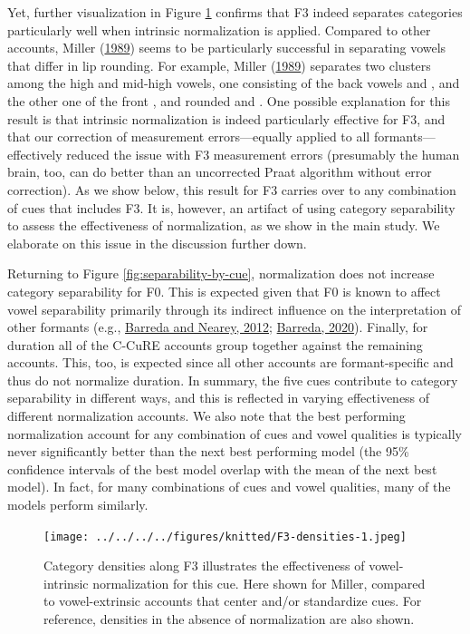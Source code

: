 \documentclass[utf8]{frontiers_suppmat} %
\begin{document}
Yet, further visualization in Figure \ref{fig:F3-densities} confirms that F3 indeed separates categories particularly well when intrinsic normalization is applied. Compared to other accounts, Miller (\protect\hyperlink{ref-miller1989c}{1989}) seems to be particularly successful in separating vowels that differ in lip rounding. For example, Miller (\protect\hyperlink{ref-miller1989c}{1989}) separates two clusters among the high and mid-high vowels, one consisting of the back vowels \ipatext{[oː]} and \ipatext{[uː]}, and the other one of the front \ipatext{[iː]}, and rounded \ipatext{[yː]} and \ipatext{[ʉː]}. One possible explanation for this result is that intrinsic normalization is indeed particularly effective for F3, and that our correction of measurement errors---equally applied to all formants---effectively reduced the issue with F3 measurement errors (presumably the human brain, too, can do better than an uncorrected Praat algorithm without error correction). As we show below, this result for F3 carries over to any combination of cues that includes F3. It is, however, an artifact of using category separability to assess the effectiveness of normalization, as we show in the main study. We elaborate on this issue in the discussion further down.

Returning to Figure \ref{fig:separability-by-cue}, normalization does not increase category separability for F0. This is expected given that F0 is known to affect vowel separability primarily through its indirect influence on the interpretation of other formants (e.g., \protect\hyperlink{ref-barreda2012a}{Barreda and Nearey, 2012}; \protect\hyperlink{ref-barreda2020a}{Barreda, 2020}). Finally, for duration all of the C-CuRE accounts group together against the remaining accounts. This, too, is expected since all other accounts are formant-specific and thus do not normalize duration. In summary, the five cues contribute to category separability in different ways, and this is reflected in varying effectiveness of different normalization accounts. We also note that the best performing normalization account for any combination of cues and vowel qualities is typically never significantly better than the next best performing model (the 95\% confidence intervals of the best model overlap with the mean of the next best model). In fact, for many combinations of cues and vowel qualities, many of the models perform similarly.

\begin{figure}
{\centering \texttt{[image: ../../../../figures/knitted/F3-densities-1.jpeg]} }
\caption{Category densities along F3 illustrates the effectiveness of vowel-intrinsic normalization for this cue. Here shown for Miller, compared to vowel-extrinsic accounts that center and/or standardize cues. For reference, densities in the absence of normalization are also shown.}\label{fig:F3-densities}
\end{figure}
\end{document}
